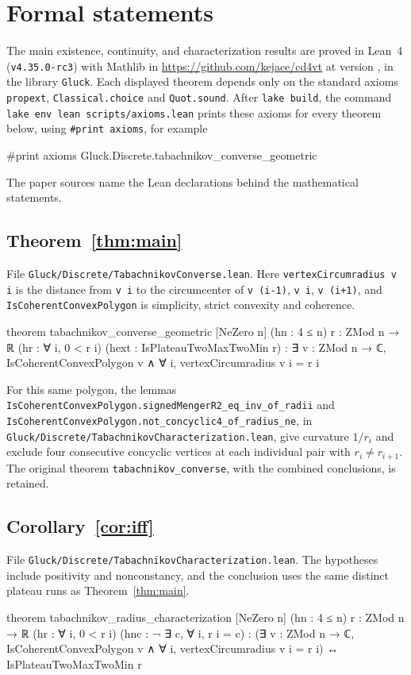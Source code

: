 \section{Formal statements}\label{sec:lean}
\begingroup\raggedright\setlength{\parindent}{1.5em}

The main existence, continuity, and characterization results are proved in
Lean~4 (\texttt{v4.35.0-rc3}) with Mathlib in
\url{https://github.com/kejace/cd4vt} at version \texttt{\leancommit}, in the
library \texttt{Gluck}. Each displayed theorem depends only on the standard
axioms \texttt{propext}, \texttt{Classical.choice} and \texttt{Quot.sound}.
After \texttt{lake build}, the command
\texttt{lake env lean scripts/axioms.lean} prints these axioms for every
theorem below, using \texttt{\#print axioms}, for example
\begin{leancode}
#print axioms Gluck.Discrete.tabachnikov_converse_geometric
\end{leancode}
The paper sources name the Lean declarations behind the mathematical statements.

\subsection*{Theorem~\ref{thm:main}}
File \nolinkurl{Gluck/Discrete/TabachnikovConverse.lean}. Here
\texttt{vertexCircumradius v i} is the distance from \texttt{v i} to the
circumcenter of \texttt{v (i-1)}, \texttt{v i}, \texttt{v (i+1)}, and
\texttt{IsCoherentConvexPolygon} is simplicity, strict convexity and
coherence.
\begin{leancode}
theorem tabachnikov_converse_geometric [NeZero n]
    (hn : 4 ≤ n) {r : ZMod n → ℝ}
    (hr : ∀ i, 0 < r i) (hext : IsPlateauTwoMaxTwoMin r) :
    ∃ v : ZMod n → ℂ, IsCoherentConvexPolygon v ∧
      ∀ i, vertexCircumradius v i = r i
\end{leancode}

For this same polygon, the lemmas
\nolinkurl{IsCoherentConvexPolygon.signedMengerR2_eq_inv_of_radii} and
\nolinkurl{IsCoherentConvexPolygon.not_concyclic4_of_radius_ne}, in
\nolinkurl{Gluck/Discrete/TabachnikovCharacterization.lean}, give curvature
$1/r_i$ and exclude four consecutive concyclic vertices at each individual
pair with $r_i\ne r_{i+1}$. The original theorem
\texttt{tabachnikov\_converse}, with the combined conclusions, is retained.

\subsection*{Corollary~\ref{cor:iff}}
File \nolinkurl{Gluck/Discrete/TabachnikovCharacterization.lean}. The
hypotheses include positivity and nonconstancy, and the conclusion uses the
same distinct plateau runs as Theorem~\ref{thm:main}.
\begin{leancode}
theorem tabachnikov_radius_characterization [NeZero n]
    (hn : 4 ≤ n) {r : ZMod n → ℝ}
    (hr : ∀ i, 0 < r i) (hnc : ¬ ∃ c, ∀ i, r i = c) :
    (∃ v : ZMod n → ℂ, IsCoherentConvexPolygon v ∧
      ∀ i, vertexCircumradius v i = r i) ↔ IsPlateauTwoMaxTwoMin r
\end{leancode}

